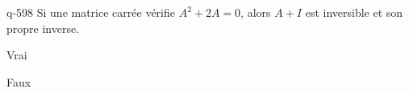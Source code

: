 \begin{truefalse}{q-598}
Si une matrice carrée vérifie $A^2+2A=0$, alors $A+I$ est inversible et son propre inverse.
\item* Vrai
\item Faux
\end{truefalse}

